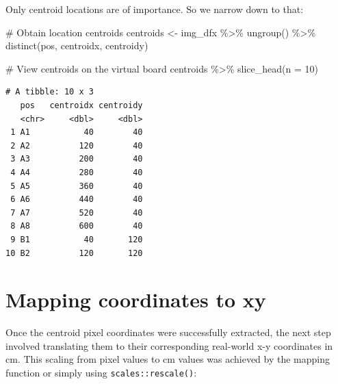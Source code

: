 \documentclass[
  letterpaper,
  DIV=11,
  numbers=noendperiod]{scrreprt}
\newenvironment{Shaded}{\begin{snugshade}}{\end{snugshade}}
\newcommand{\AttributeTok}[1]{\textcolor[rgb]{0.40,0.45,0.13}{#1}}
\newcommand{\CommentTok}[1]{\textcolor[rgb]{0.37,0.37,0.37}{#1}}
\newcommand{\DecValTok}[1]{\textcolor[rgb]{0.68,0.00,0.00}{#1}}
\newcommand{\FunctionTok}[1]{\textcolor[rgb]{0.28,0.35,0.67}{#1}}
\newcommand{\NormalTok}[1]{\textcolor[rgb]{0.00,0.23,0.31}{#1}}
\newcommand{\OtherTok}[1]{\textcolor[rgb]{0.00,0.23,0.31}{#1}}
\newcommand{\SpecialCharTok}[1]{\textcolor[rgb]{0.37,0.37,0.37}{#1}}
\begin{document}
Only centroid locations are of importance. So we narrow down to that:

\begin{Shaded}
\begin{Highlighting}[]
\CommentTok{\# Obtain location centroids}
\NormalTok{centroids }\OtherTok{\textless{}{-}}\NormalTok{ img\_dfx }\SpecialCharTok{\%\textgreater{}\%} 
  \FunctionTok{ungroup}\NormalTok{() }\SpecialCharTok{\%\textgreater{}\%} 
  \FunctionTok{distinct}\NormalTok{(pos, centroidx, centroidy)}

\CommentTok{\# View centroids on the virtual board}
\NormalTok{centroids }\SpecialCharTok{\%\textgreater{}\%} 
  \FunctionTok{slice\_head}\NormalTok{(}\AttributeTok{n =} \DecValTok{10}\NormalTok{)}
\end{Highlighting}
\end{Shaded}

\begin{verbatim}
# A tibble: 10 x 3
   pos   centroidx centroidy
   <chr>     <dbl>     <dbl>
 1 A1           40        40
 2 A2          120        40
 3 A3          200        40
 4 A4          280        40
 5 A5          360        40
 6 A6          440        40
 7 A7          520        40
 8 A8          600        40
 9 B1           40       120
10 B2          120       120
\end{verbatim}

\hypertarget{mapping-coordinates-to-xy}{%
\section{Mapping coordinates to xy}\label{mapping-coordinates-to-xy}}

Once the centroid pixel coordinates were successfully extracted, the
next step involved translating them to their corresponding real-world
x-y coordinates in cm. This scaling from pixel values to cm values was
achieved by the mapping function or simply using
\texttt{scales::rescale()}:
\end{document}
